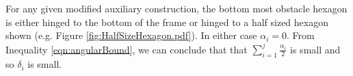 For any given modified auxiliary construction, the bottom most obstacle hexagon is either hinged to the bottom of the frame or hinged to a half sized hexagon shown (e.g. Figure \ref{fig:HalfSizeHexagon.pdf}).
In either case $\alpha_i = 0$.  
From Inequality \ref{eqn:angularBound}, we can conclude that that $\sum_{i=1}^j \frac{\alpha_i}{2}$ is small and so $\delta_i$ is small.
